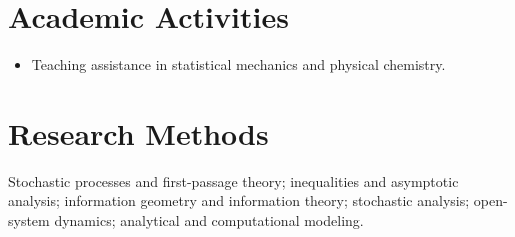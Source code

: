 \documentclass[10pt,a4paper]{article}
\begin{document}
\section{Academic Activities}

\begin{itemize}
  \item Teaching assistance in statistical mechanics and physical chemistry.
\end{itemize}

\section{Research Methods}

Stochastic processes and first-passage theory; inequalities and asymptotic analysis; information geometry and information theory; stochastic analysis; open-system dynamics; analytical and computational modeling.
\end{document}
